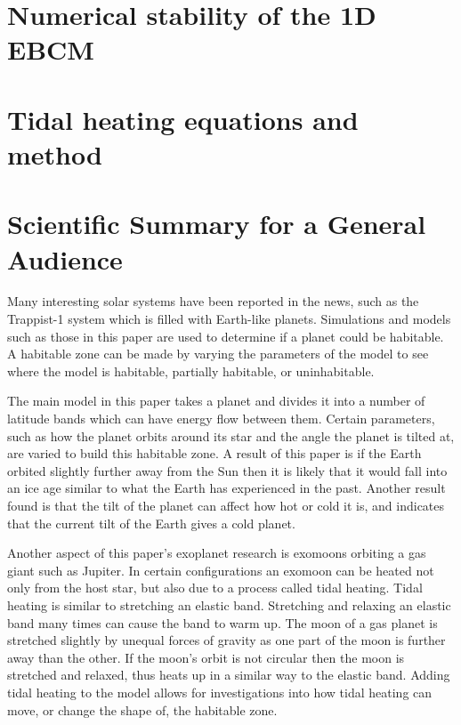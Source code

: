 \documentclass[12pt, onecolumn]{revtex4-2}    %
\begin{document}
\section{Numerical stability of the 1D EBCM} \label{appx:NumStability}

\section{Tidal heating equations and method} \label{appx:TidalHeatingEquationsMethod}

\clearpage

\section*{Scientific Summary for a General Audience}

Many interesting solar systems have been reported in the news, such as the Trappist-1 system which is filled with Earth-like planets.
Simulations and models such as those in this paper are used to determine if a planet could be habitable.
A habitable zone can be made by varying the parameters of the model to see where the model is habitable, partially habitable, or uninhabitable.

The main model in this paper takes a planet and divides it into a number of latitude bands which can have energy flow between them.
Certain parameters, such as how the planet orbits around its star and the angle the planet is tilted at, are varied to build this habitable zone.
A result of this paper is if the Earth orbited slightly further away from the Sun then it is likely that it would fall into an ice age similar to what the Earth has experienced in the past.
Another result found is that the tilt of the planet can affect how hot or cold it is, and indicates that the current tilt of the Earth gives a cold planet.

Another aspect of this paper's exoplanet research is exomoons orbiting a gas giant such as Jupiter.
In certain configurations an exomoon can be heated not only from the host star, but also due to a process called tidal heating.
Tidal heating is similar to stretching an elastic band.
Stretching and relaxing an elastic band many times can cause the band to warm up.
The moon of a gas planet is stretched slightly by unequal forces of gravity as one part of the moon is further away than the other.
If the moon's orbit is not circular then the moon is stretched and relaxed, thus heats up in a similar way to the elastic band.
Adding tidal heating to the model allows for investigations into how tidal heating can move, or change the shape of, the habitable zone.
\end{document}
